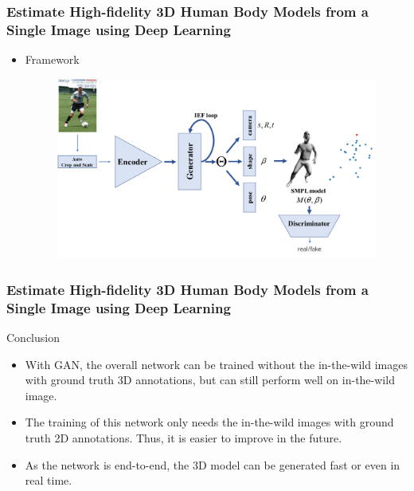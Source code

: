 \begin{frame}
    \frametitle{Estimate High-fidelity 3D Human Body Models from a Single Image using Deep Learning}
    \begin{itemize}
        \item Framework
        \begin{figure}
            \includegraphics[width=1.0\linewidth]{./img/framework_HMR.png}
        \end{figure}
    \end{itemize}
\end{frame}

\begin{frame}
    \frametitle{Estimate High-fidelity 3D Human Body Models from a Single Image using Deep Learning}
    \begin{block}{Conclusion}
        \begin{itemize}
        \small
        \item With GAN, the overall network can be trained without the in-the-wild images with ground truth 3D annotations, but can still perform well on in-the-wild image.
        \item The training of this network only needs the in-the-wild images with ground truth 2D annotations. Thus, it is easier to improve in the future.       
        \item As the network is end-to-end, the 3D model can be generated fast or even in real time.
        \end{itemize}    
    \end{block}
\end{frame}
